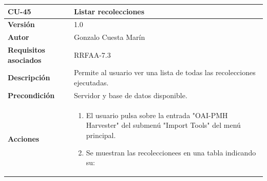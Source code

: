 \documentclass[
]{article}
\providecommand{\tightlist}{%
  \setlength{\itemsep}{0pt}\setlength{\parskip}{0pt}}
\begin{document}
\begin{longtable}[]{@{}ll@{}}
\toprule
\begin{minipage}[b]{0.19\columnwidth}\raggedright
\textbf{CU-45}\strut
\end{minipage} & \begin{minipage}[b]{0.76\columnwidth}\raggedright
\textbf{Listar recolecciones}\strut
\end{minipage}\tabularnewline
\midrule
\endhead
\begin{minipage}[t]{0.19\columnwidth}\raggedright
\textbf{Versión}\strut
\end{minipage} & \begin{minipage}[t]{0.76\columnwidth}\raggedright
1.0\strut
\end{minipage}\tabularnewline
\begin{minipage}[t]{0.19\columnwidth}\raggedright
\textbf{Autor}\strut
\end{minipage} & \begin{minipage}[t]{0.76\columnwidth}\raggedright
Gonzalo Cuesta Marín\strut
\end{minipage}\tabularnewline
\begin{minipage}[t]{0.19\columnwidth}\raggedright
\textbf{Requisitos asociados}\strut
\end{minipage} & \begin{minipage}[t]{0.76\columnwidth}\raggedright
RRFAA-7.3\strut
\end{minipage}\tabularnewline
\begin{minipage}[t]{0.19\columnwidth}\raggedright
\textbf{Descripción}\strut
\end{minipage} & \begin{minipage}[t]{0.76\columnwidth}\raggedright
Permite al usuario ver una lista de todas las recolecciones
ejecutadas.\strut
\end{minipage}\tabularnewline
\begin{minipage}[t]{0.19\columnwidth}\raggedright
\textbf{Precondición}\strut
\end{minipage} & \begin{minipage}[t]{0.76\columnwidth}\raggedright
Servidor y base de datos disponible.\strut
\end{minipage}\tabularnewline
\begin{minipage}[t]{0.19\columnwidth}\raggedright
\textbf{Acciones}\strut
\end{minipage} & \begin{minipage}[t]{0.76\columnwidth}\raggedright
\begin{enumerate}
\def\labelenumi{\arabic{enumi}.}
\tightlist
\item
  El usuario pulsa sobre la entrada "OAI-PMH Harvester" del submenú
  "Import Tools" del menú principal.
\item
  Se muestran las recoleccionees en una tabla indicando su:


\end{enumerate}
\end{minipage}
\end{longtable}
\end{document}
